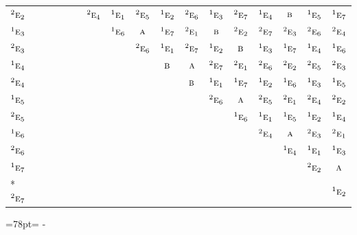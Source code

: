 \documentclass[10pt,a4paper]{article}
\newcommand{\needspace}[1]{\par\penalty-100\begingroup\dimen0=#1\relax\dimen2=\pagegoal
  \advance\dimen2-\pagetotal\ifdim\dimen0>\dimen2\relax\ifdim\dimen2>0pt\vfil\break\fi\fi
  \endgroup}
\numberwithin{equation}{section}
\newcommand{\irr}[1]{\text{\normalfont\scshape #1}}
\newcommand{\conjpair}[1]{{}^{#1}}
\begin{document}
{\begin{longtable}{@{}lcccccccccccccccc@{}}
$\conjpair{2}\irr{e}_{2}$ &  &  &  &  &  & $\conjpair{2}\irr{e}_{4}$ & $\conjpair{1}\irr{e}_{1}$ & $\conjpair{2}\irr{e}_{5}$ & $\conjpair{1}\irr{e}_{2}$ & $\conjpair{2}\irr{e}_{6}$ & $\conjpair{1}\irr{e}_{3}$ & $\conjpair{2}\irr{e}_{7}$ & $\conjpair{1}\irr{e}_{4}$ & $\irr{b}$ & $\conjpair{1}\irr{e}_{5}$ & $\conjpair{1}\irr{e}_{7}$\\
$\conjpair{1}\irr{e}_{3}$ &  &  &  &  &  &  & $\conjpair{1}\irr{e}_{6}$ & $\irr{a}$ & $\conjpair{1}\irr{e}_{7}$ & $\conjpair{2}\irr{e}_{1}$ & $\irr{b}$ & $\conjpair{2}\irr{e}_{2}$ & $\conjpair{2}\irr{e}_{7}$ & $\conjpair{2}\irr{e}_{3}$ & $\conjpair{2}\irr{e}_{6}$ & $\conjpair{2}\irr{e}_{4}$\\
$\conjpair{2}\irr{e}_{3}$ &  &  &  &  &  &  &  & $\conjpair{2}\irr{e}_{6}$ & $\conjpair{1}\irr{e}_{1}$ & $\conjpair{2}\irr{e}_{7}$ & $\conjpair{1}\irr{e}_{2}$ & $\irr{b}$ & $\conjpair{1}\irr{e}_{3}$ & $\conjpair{1}\irr{e}_{7}$ & $\conjpair{1}\irr{e}_{4}$ & $\conjpair{1}\irr{e}_{6}$\\
$\conjpair{1}\irr{e}_{4}$ &  &  &  &  &  &  &  &  & $\irr{b}$ & $\irr{a}$ & $\conjpair{2}\irr{e}_{7}$ & $\conjpair{2}\irr{e}_{1}$ & $\conjpair{2}\irr{e}_{6}$ & $\conjpair{2}\irr{e}_{2}$ & $\conjpair{2}\irr{e}_{5}$ & $\conjpair{2}\irr{e}_{3}$\\
$\conjpair{2}\irr{e}_{4}$ &  &  &  &  &  &  &  &  &  & $\irr{b}$ & $\conjpair{1}\irr{e}_{1}$ & $\conjpair{1}\irr{e}_{7}$ & $\conjpair{1}\irr{e}_{2}$ & $\conjpair{1}\irr{e}_{6}$ & $\conjpair{1}\irr{e}_{3}$ & $\conjpair{1}\irr{e}_{5}$\\
$\conjpair{1}\irr{e}_{5}$ &  &  &  &  &  &  &  &  &  &  & $\conjpair{2}\irr{e}_{6}$ & $\irr{a}$ & $\conjpair{2}\irr{e}_{5}$ & $\conjpair{2}\irr{e}_{1}$ & $\conjpair{2}\irr{e}_{4}$ & $\conjpair{2}\irr{e}_{2}$\\
$\conjpair{2}\irr{e}_{5}$ &  &  &  &  &  &  &  &  &  &  &  & $\conjpair{1}\irr{e}_{6}$ & $\conjpair{1}\irr{e}_{1}$ & $\conjpair{1}\irr{e}_{5}$ & $\conjpair{1}\irr{e}_{2}$ & $\conjpair{1}\irr{e}_{4}$\\
$\conjpair{1}\irr{e}_{6}$ &  &  &  &  &  &  &  &  &  &  &  &  & $\conjpair{2}\irr{e}_{4}$ & $\irr{a}$ & $\conjpair{2}\irr{e}_{3}$ & $\conjpair{2}\irr{e}_{1}$\\
$\conjpair{2}\irr{e}_{6}$ &  &  &  &  &  &  &  &  &  &  &  &  &  & $\conjpair{1}\irr{e}_{4}$ & $\conjpair{1}\irr{e}_{1}$ & $\conjpair{1}\irr{e}_{3}$\\
$\conjpair{1}\irr{e}_{7}$ &  &  &  &  &  &  &  &  &  &  &  &  &  &  & $\conjpair{2}\irr{e}_{2}$ & $\irr{a}$\\*
$\conjpair{2}\irr{e}_{7}$ &  &  &  &  &  &  &  &  &  &  &  &  &  &  &  & $\conjpair{1}\irr{e}_{2}$\\
\bottomrule\end{longtable}}
\needspace{78pt}
\end{document}
